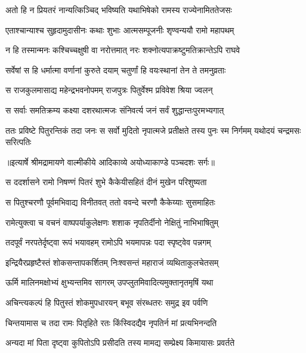 \twolineshloka
{अतो हि न प्रियतरं नान्यत्किञ्चिद् भविष्यति}
{यथाभिषेको रामस्य राज्येनामिततेजसः} %

\twolineshloka
{एताश्चान्याश्च सुहृदामुदासीनः कथाः शुभाः}
{आत्मसम्पूजनीः शृण्वन्ययौ रामो महापथम्} %

\twolineshloka
{न हि तस्मान्मनः कश्चिच्चक्षुषी वा नरोत्तमात्}
{नरः शक्नोत्यपाक्रष्टुमतिक्रान्तेऽपि राघवे} %

\twolineshloka
{सर्वेषां स हि धर्मात्मा वर्णानां कुरुते दयाम्}
{चतुर्णां हि वयःस्थानां तेन ते तमनुव्रताः} %

\twolineshloka
{स राजकुलमासाद्य महेन्द्रभवनोपमम्}
{राजपुत्रः पितुर्वेश्म प्रविवेश श्रिया ज्वलन्} %

\twolineshloka
{स सर्वाः समतिक्रम्य कक्ष्या दशरथात्मजः}
{संनिवर्त्य जनं सर्वं शुद्धान्तःपुरमभ्यगात्} %

\fourlineindentedshloka
{ततः प्रविष्टे पितुरन्तिकं तदा}
{जनः स सर्वो मुदितो नृपात्मजे}
{प्रतीक्षते तस्य पुनः स्म निर्गमम्}
{यथोदयं चन्द्रमसः सरित्पतिः} %


{॥इत्यार्षे श्रीमद्रामायणे वाल्मीकीये आदिकाव्ये अयोध्याकाण्डे पञ्चदशः सर्गः॥}


\twolineshloka
{स ददर्शासने रामो निषण्णं पितरं शुभे}
{कैकेयीसहितं दीनं मुखेन परिशुष्यता} %

\twolineshloka
{स पितुश्चरणौ पूर्वमभिवाद्य विनीतवत्}
{ततो ववन्दे चरणौ कैकेय्याः सुसमाहितः} %

\twolineshloka
{रामेत्युक्त्वा च वचनं वाष्पपर्याकुलेक्षणः}
{शशाक नृपतिर्दीनो नेक्षितुं नाभिभाषितुम्} %

\twolineshloka
{तदपूर्वं नरपतेर्दृष्ट्वा रूपं भयावहम्}
{रामोऽपि भयमापन्नः पदा स्पृष्ट्वेव पन्नगम्} %

\twolineshloka
{इन्द्रियैरप्रहृष्टैस्तं शोकसन्तापकर्शितम्}
{निःश्वसन्तं महाराजं व्यथिताकुलचेतसम्} %

\twolineshloka
{ऊर्मि मालिनमक्षोभ्यं क्षुभ्यन्तमिव सागरम्}
{उपप्लुतमिवादित्यमुक्तानृतमृषिं यथा} %

\twolineshloka
{अचिन्त्यकल्पं हि पितुस्तं शोकमुपधारयन्}
{बभूव संरब्धतरः समुद्र इव पर्वणि} %

\twolineshloka
{चिन्तयामास च तदा रामः पितृहिते रतः}
{किंस्विदद्यैव नृपतिर्न मां प्रत्यभिनन्दति} %

\twolineshloka
{अन्यदा मां पिता दृष्ट्वा कुपितोऽपि प्रसीदति}
{तस्य मामद्य सम्प्रेक्ष्य किमायासः प्रवर्तते} %

